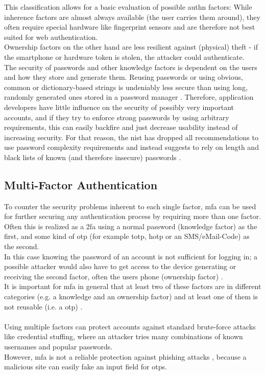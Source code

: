 This classification allows for a basic evaluation of possible \ac{authn} factors: While inherence factors are almost always available (the user carries them around), they often require special hardware like fingerprint sensors and are therefore not best suited for web authentication.\\
Ownership factors on the other hand are less resilient against (physical) theft - if the smartphone or hardware token is stolen, the attacker could authenticate.\\
The security of passwords and other knowledge factors is dependent on the users and how they store and generate them. Reusing passwords or using obvious, common or dictionary-based strings is undeniably less secure than using long, randomly generated ones stored in a password manager \cite{lyastani2018,hunt2011,hunt2018c}. Therefore, application developers have little influence on the security of possibly very important accounts, and if they try to enforce strong passwords by using arbitrary requirements, this can easily backfire \cite{hunt2017} and just decrease usability instead of increasing security. For that reason, the \ac{nist} has dropped all recommendations to use password complexity requirements and instead suggests to rely on length and black lists of known (and therefore insecure) passwords \cite{nist}.

\subsection{Multi-Factor Authentication}
\label{subsec:mfa}

To counter the security problems inherent to each single factor, \ac{mfa} can be used for further securing any authentication process by requiring more than one factor. Often this is realized as a \ac{2fa} using a normal password (knowledge factor) as the first, and some kind of \ac{otp} (for example \ac{totp}, \ac{hotp} or an SMS/eMail-Code) as the second.\\
In this case knowing the password of an account is not sufficient for logging in; a possible attacker would also have to get access to the device generating or receiving the second factor, often the users phone (ownership factor) \cite{statista_2fa,hunt2018a}.\\
It is important for \ac{mfa} in general that at least two of these factors are in different categories (e.g. a knowledge and an ownership factor) and at least one of them is not reusable (i.e. a \ac{otp}) \cite{nist,turner2016}.\\
\\
Using multiple factors can protect accounts against standard brute-force attacks like credential stuffing, where an attacker tries many combinations of known usernames and popular passwords.\\
However, \ac{mfa} is not a reliable protection against phishing attacks \cite{lyastani2020}, because a malicious site can easily fake an input field for \acp{otp}.


